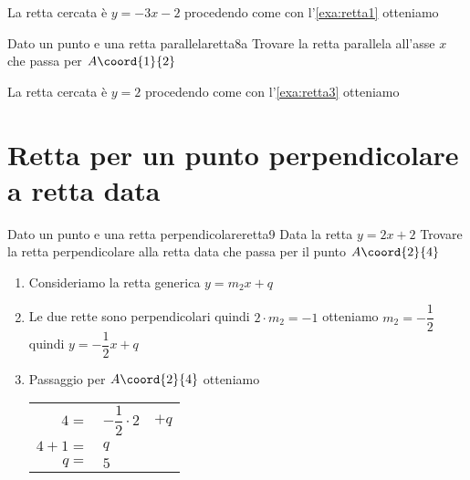 La retta cercata è $y=-3x-2$ procedendo come con l'\cref{exa:retta1}
otteniamo
\begin{center}
	
	\label{fig:disegnoretta8}
\end{center}
\begin{esempiot}{Dato un punto e una retta parallela}{retta8a}
	Trovare la retta parallela all'asse $x$ che passa per $A\coord{1}{2}$
\end{esempiot}
La retta cercata è $y=2$ procedendo come con l'\cref{exa:retta3}
otteniamo
\begin{center}
	
	\label{fig:disegnoretta8a}
\end{center}
\section{Retta per un punto perpendicolare a retta data}
\begin{esempiot}{Dato un punto e una retta perpendicolare}{retta9}
	Data la retta $y=2x+2$ Trovare la retta perpendicolare alla retta data che  passa per il punto	$A\coord{2}{4}$
\end{esempiot}
\begin{enumerate}
	\item Consideriamo la retta generica $y=m_2x+q$
	\item Le due rette sono perpendicolari quindi $2\cdot m_2=-1$ otteniamo $m_2=-\dfrac{1}{2}$ quindi $y=-\dfrac{1}{2}x+q$
	\item Passaggio per $A\coord{2}{4}$ otteniamo 
	\begin{tabular}{rll}
		$4=$&$-\dfrac{1}{2}\cdot 2$&$+q$\\
		$4+1=$&$q$\\
		$q=$&$5$\\
	\end{tabular}
\end{enumerate}

